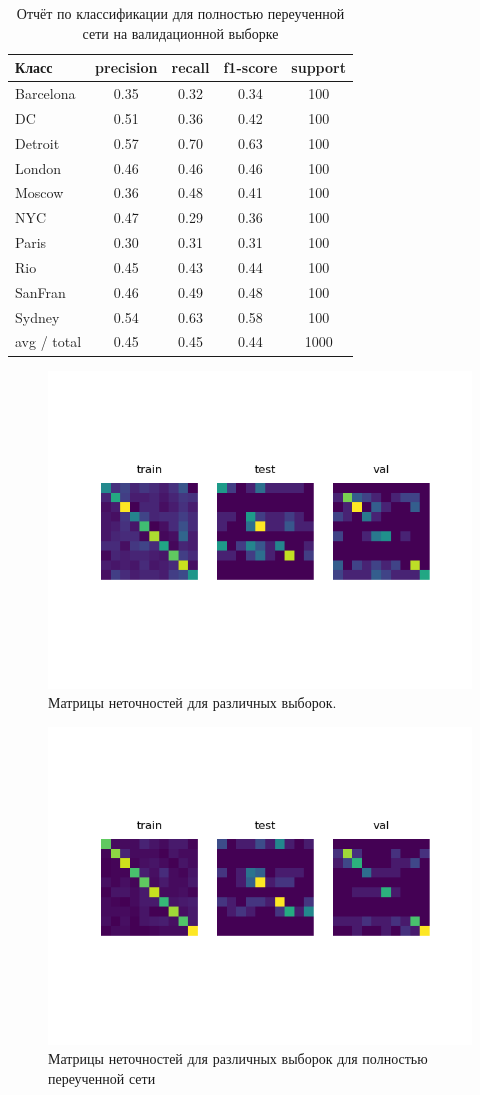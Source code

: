 \begin{table}[h]
	\centering
\begin{tabu}{l|cccc}
	Класс & precision & recall & f1-score & support \\ \hline
	Barcelona        &   0.35    &  0.32  &   0.34   &   100   \\
	DC               &   0.51    &  0.36  &   0.42   &   100   \\
	Detroit          &   0.57    &  0.70  &   0.63   &   100   \\
	London           &   0.46    &  0.46  &   0.46   &   100   \\
	Moscow           &   0.36    &  0.48  &   0.41   &   100   \\
	NYC              &   0.47    &  0.29  &   0.36   &   100   \\
	Paris            &   0.30    &  0.31  &   0.31   &   100   \\
	Rio              &   0.45    &  0.43  &   0.44   &   100   \\
	SanFran          &   0.46    &  0.49  &   0.48   &   100   \\
	Sydney           &   0.54    &  0.63  &   0.58   &   100   \\
	avg / total      &   0.45    &  0.45  &   0.44   &  1000   \\\hline
\end{tabu}
\label{tbl:clsrep}
\caption{Отчёт по классификации для полностью переученной сети на валидационной выборке}
\end{table}

\begin{figure}[h]
	\centering
	\includegraphics[width=0.7\linewidth]{img/confM}
	\caption{Матрицы неточностей для различных выборок.}
	\label{fig:confm}
\end{figure}

\begin{figure}[h]
	\centering
	\includegraphics[width=0.7\linewidth]{img/confM2}
	\caption{Матрицы неточностей для различных выборок для полностью переученной сети }
	\label{fig:confm2}
\end{figure}
